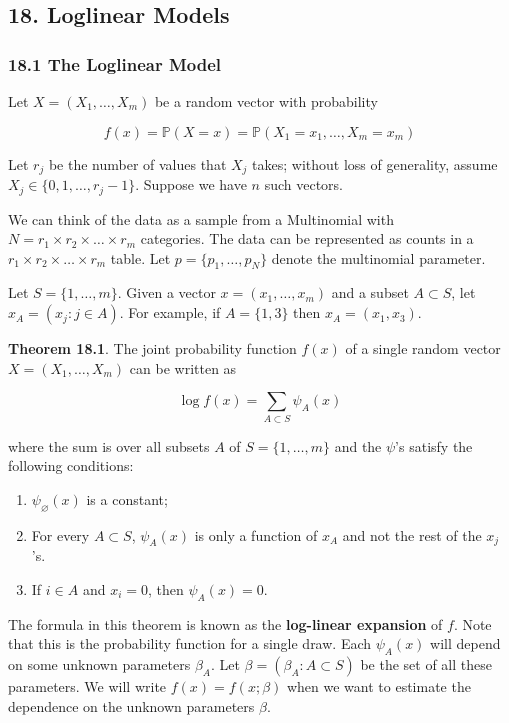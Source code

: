 \subsection{18. Loglinear Models}\label{loglinear-models}

\subsubsection{18.1 The Loglinear Model}\label{the-loglinear-model}

Let \(X = (X_1, \dots, X_m)\) be a random vector with probability

\[ f(x) = \mathbb{P}(X = x) = \mathbb{P}(X_1 = x_1, \dots, X_m = x_m) \]

Let \(r_j\) be the number of values that \(X_j\) takes; without loss of
generality, assume \(X_j \in \{ 0, 1, \dots, r_j - 1 \}\). Suppose we
have \(n\) such vectors.

We can think of the data as a sample from a Multinomial with
\(N = r_1 \times r_2 \times \dots \times r_m\) categories. The data can
be represented as counts in a \(r_1 \times r_2 \times \dots \times r_m\)
table. Let \(p = \{ p_1, \dots, p_N \}\) denote the multinomial
parameter.

Let \(S = \{ 1, \dots, m \}\). Given a vector \(x = (x_1, \dots, x_m)\)
and a subset \(A \subset S\), let \(x_A = (x_j : j \in A)\). For
example, if \(A = \{1, 3\}\) then \(x_A = (x_1, x_3)\).

\textbf{Theorem 18.1}. The joint probability function \(f(x)\) of a
single random vector \(X = (X_1, \dots, X_m)\) can be written as

\[ \log f(x) = \sum_{A \subset S} \psi_A(x) \]

where the sum is over all subsets \(A\) of \(S = \{1, \dots, m \}\) and
the \(\psi\)'s satisfy the following conditions:

\begin{enumerate}[tightlist,label={\arabic*.}]
\item
  \(\psi_\varnothing(x)\) is a constant;
\item
  For every \(A \subset S\), \(\psi_A(x)\) is only a function of \(x_A\)
  and not the rest of the \(x_j\)'s.
\item
  If \(i \in A\) and \(x_i = 0\), then \(\psi_A(x) = 0\).
\end{enumerate}

The formula in this theorem is known as the \textbf{log-linear
expansion} of \(f\). Note that this is the probability function for a
single draw. Each \(\psi_A(x)\) will depend on some unknown parameters
\(\beta_A\). Let \(\beta = (\beta_A : A \subset S)\) be the set of all
these parameters. We will write \(f(x) = f(x; \beta)\) when we want to
estimate the dependence on the unknown parameters \(\beta\).


